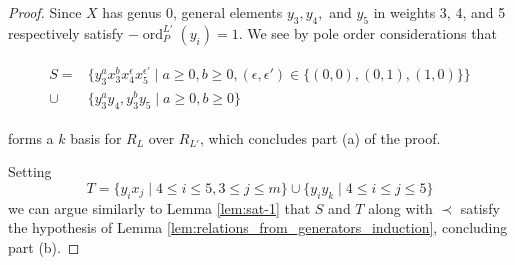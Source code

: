 \documentclass{amsart}
\theoremstyle{plain}
\theoremstyle{definition}
\theoremstyle{remark}
\numberwithin{equation}{section}
\DeclareMathOperator{\ord}{ord}
\newcommand{\halfcan}{L}
\DeclareMathOperator{\initial}{in_\prec}
\begin{document}
\begin{proof}
Since $X$ has genus 0, general
elements $y_3, y_4,$ and $y_5$ in weights 3, 4, and 5 respectively satisfy $-\ord_P^{\halfcan'}(y_i) =
1$. We see by pole order considerations that

\begin{align}
\label{eqn:add_one_generator}
	\begin{split}
		S=	&\{ y_3^ax_3^b x_4^\epsilon x_5^{\epsilon'} \mid a \geq 0, b 
		\geq 0,(\epsilon, \epsilon') \in \{(0,0),(0,1),(1,0)\} \} \\
		\cup \;&\{y_3^ay_4, y_3^by_5 \mid a \geq 0, b \geq 0 \}
	\end{split}
\end{align}

\noindent forms a $k$ basis for $R_\halfcan$ over $R_{\halfcan'}$, which concludes part (a) of the proof.

Setting
\[
	T = \{ y_i x_j \mid 4 \leq i \leq 5, 3 \leq j \leq m\} \cup \{ y_i y_k \mid 4 \leq i \leq j \leq 5\} 
\]
we can argue similarly to Lemma \ref{lem:sat-1} that $S$ and $T$ along with $\prec$ satisfy the hypothesis of Lemma \ref{lem:relations_from_generators_induction}, concluding part (b).



%
%
%
%
%
%


\end{proof}
\end{document}

